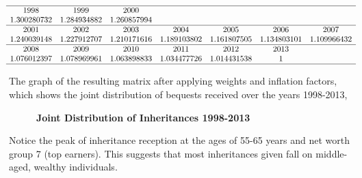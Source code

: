 \documentclass[letterpaper,12pt]{article}
\theoremstyle{definition}
\begin{document}
\begin{spacing}{1.5}
  \[
  \begin{matrix}
  \hline
  

    1998&  1999&  2000\\

   1.300280732 & 1.284934882 & 1.260857994  \\
  \hline
   2001&2002&  2003&  2004&  2005&  2006 &2007\\

    1.240039148 & 1.227912707 & 1.210171616 & 1.189103802 & 1.161807505 & 1.134803101& 1.109966432  \\
    \hline

      2008&  2009&  2010&  2011&  2012&  2013\\

    1.076012397 & 1.078969961 & 1.063898833 & 1.034477726 & 1.014431538 & 1\\
  \hline

  \end{matrix}\]

  The graph of the resulting matrix after applying weights and inflation factors, which shows the joint distribution of bequests received over the years 1998-2013,\\
  \begin{figure}[htbp]\centering \captionsetup{width=5.0in}
    \caption{\label{proportions}\textbf{Joint Distribution of Inheritances 1998-2013}}
  \end{figure}

  

  \newpage Notice the peak of inheritance reception at the ages of 55-65 years and net worth group 7 (top earners). This suggests that most inheritances given fall on middle-aged, wealthy individuals.




\end{spacing}
\end{document}
